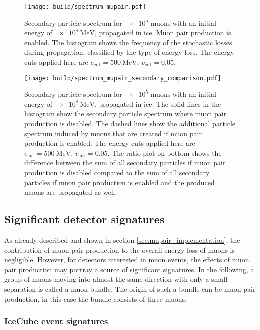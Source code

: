 \begin{figure}
    \centering
    \texttt{[image: build/spectrum\_mupair.pdf]}
    \caption{Secondary particle spectrum for $\num{e5}$ muons with an initial energy of $\SI{e8}{\mega\electronvolt}$, propagated in ice. Muon pair production is enabled. The histogram shows the frequency of the stochastic losses during propagation, classified by the type of energy loss. The energy cuts applied here are $e_\text{cut} = \SI{500}{\mega\electronvolt}$, $v_\text{cut} = 0.05$.}
    \label{fig:spectrum_mupair}
\end{figure}

\begin{figure}
    \centering
    \texttt{[image: build/spectrum\_mupair\_secondary\_comparison.pdf]}
    \caption{Secondary particle spectrum for $\num{e5}$ muons with an initial energy of $\SI{e8}{\mega\electronvolt}$, propagated in ice. The solid lines in the histogram show the secondary particle spectrum where muon pair production is disabled. The dashed lines show the additional particle spectrum induced by muons that are created if muon pair production is enabled. The energy cuts applied here are $e_\text{cut} = \SI{500}{\mega\electronvolt}$, $v_\text{cut} = 0.05$. The ratio plot on bottom shows the difference between the sum of all secondary particles if muon pair production is disabled compared to the sum of all secondary particles if muon pair production is enabled and the produced muons are propagated as well.}
    \label{fig:spectrum_mupair_secondary}
\end{figure}

\subsection{Significant detector signatures}
\label{sec:signatures}

As already described and shown in section \ref{sec:mupair_implementation}, the contribution of muon pair production to the overall energy loss of muons is negligible.
However, for detectors interested in muon events, the effects of muon pair production may portray a source of significant signatures.
In the following, a group of muons moving into almost the same direction with only a small separation is called a muon bundle.
The origin of such a bundle can be muon pair production, in this case the bundle consists of three muons.

\subsubsection{IceCube event signatures}


